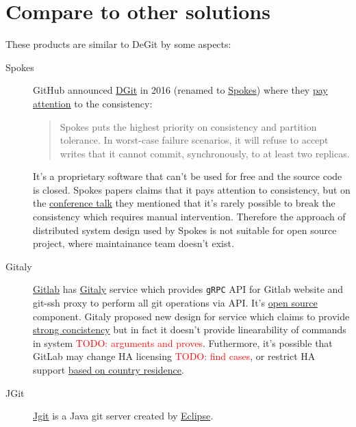 \documentclass[12pt,oneside]{article}
\newcommand{\code}[1]{\texttt{#1}}
\newcommand{\todo}[1]{\textcolor{red}{TODO: #1}}
\begin{document}
\section{Compare to other solutions}

These products are similar to DeGit by some aspects:
\begin{description}
  \item[Spokes]
    GitHub announced \href{https://github.blog/2016-04-05-introducing-dgit/}{DGit}
    in 2016 (renamed to \href{https://github.blog/2016-09-07-building-resilience-in-spokes/}{Spokes})
    where they \href{https://github.blog/2016-09-07-building-resilience-in-spokes/#defining-resilience}{pay attention}
    to the consistency:
    \begin{quote}
      Spokes puts the highest priority on consistency and partition tolerance.
      In worst-case failure scenarios, it will refuse to accept writes that it cannot commit,
      synchronously, to at least two replicas.
    \end{quote}
    It's a proprietary software that can't be used for free and the source code is closed.
    Spokes papers claims that it pays attention to consistency, but on the
    \href{https://www.youtube.com/watch?v=DY0yNRNkYb0}{conference talk} they mentioned that
    it's rarely possible to break the consistency which requires manual intervention.
    Therefore the approach of distributed system design used by Spokes is not suitable for open
    source project, where maintainance team doesn't exist.
  \item[Gitaly]
    \href{https://docs.gitlab.com/ee/README.html}{Gitlab} has
    \href{https://docs.gitlab.com/ee/administration/gitaly/}{Gitaly} service which provides
    \code{gRPC} API for Gitlab website and git-ssh proxy to perform all git operations via API.
    It's \href{https://gitlab.com/gitlab-org/gitaly}{open source} component.
    Gitaly proposed new design for service which claims to provide
    \href{https://gitlab.com/gitlab-org/gitaly/-/blob/master/doc/design\_ha.md\#strong-consistency-design}{strong concistency}
    but in fact it doesn't provide linearability of commands in system \todo{arguments and proves}.
    Futhermore, it's possible that GitLab may change HA licensing \todo{find cases},
    or restrict HA support \href{https://news.ycombinator.com/item?id=21437334}{based on country residence}.
  \item[JGit]
    \href{https://www.eclipse.org/jgit/}{Jgit} is a Java git server created by \href{https://www.eclipse.org/}{Eclipse}.

\end{description}
\end{document}
